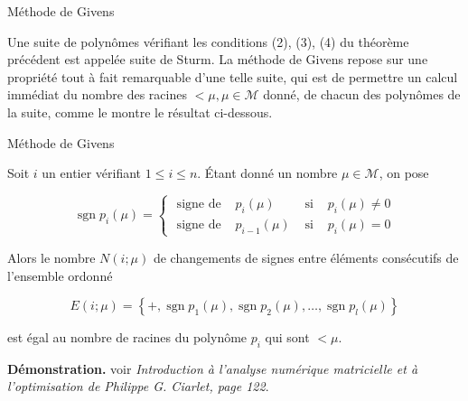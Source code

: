 \documentclass[french, 10pt]{beamer}
\theoremstyle{definition}
\begin{document}
\begin{frame}{Méthode de Givens}
	
	Une suite de polynômes vérifiant les conditions (2), (3), (4) du théorème précédent est appelée suite de Sturm. La méthode de Givens repose sur une propriété tout à fait remarquable d'une telle suite, qui est de permettre un calcul immédiat du nombre des racines $<\mu, \mu \in \mathcal{M}$ donné, de chacun des polynômes de la suite, comme le montre le résultat ci-dessous.
	
\end{frame}
\begin{frame}{Méthode de Givens}
		\begin{theorem}
		Soit $i$ un entier vérifiant $1 \leqslant i \leqslant n$. Étant donné un nombre $\mu \in \mathcal{M} $, on pose
		
		$$
		\operatorname{sgn} p_i(\mu)=\left\{\begin{array}{llll}
			\text { signe de } & p_i(\mu) & \text { si } & p_i(\mu) \neq 0 \\
			\text { signe de } & p_{i-1}(\mu) & \text { si } & p_i(\mu)=0
		\end{array}\right.
		$$
		
		
		Alors le nombre $N(i ; \mu)$ de changements de signes entre éléments consécutifs de l'ensemble ordonné
		
		$$
		E(i ; \mu)=\left\{+, \operatorname{sgn} p_1(\mu), \operatorname{sgn} p_2(\mu), \ldots, \operatorname{sgn} p_l(\mu)\right\}
		$$
		
		est égal au nombre de racines du polynôme $p_i$ qui sont $<\mu$.
	\end{theorem}
		\textbf{Démonstration.} voir \textit{Introduction à l'analyse numérique matricielle et à l'optimisation de Philippe G. Ciarlet, page 122}.
\end{frame}
\end{document}
